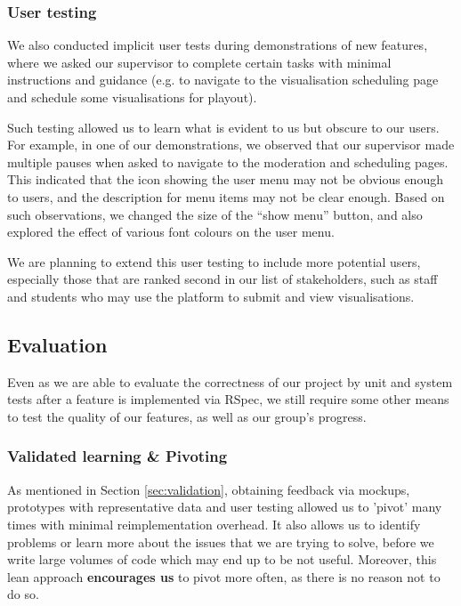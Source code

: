 ﻿\documentclass[a4paper, titlepage]{article}
\begin{document}
\subsubsection{User testing}

We also conducted implicit user tests during demonstrations of new features, where we asked our supervisor to complete certain tasks with minimal instructions and guidance (e.g. to navigate to the visualisation scheduling page and schedule some visualisations for playout).

Such testing allowed us to learn what is evident to us but obscure to our users. For example, in one of our demonstrations, we observed that our supervisor made multiple pauses when asked to navigate to the moderation and scheduling pages. This indicated that the icon showing the user menu may not be obvious enough to users, and the description for menu items may not be clear enough. Based on such observations, we changed the size of the ``show menu'' button, and also explored the effect of various font colours on the user menu.

We are planning to extend this user testing to include more potential users, especially those that are ranked second in our list of stakeholders, such as staff and students who may use the platform to submit and 
view visualisations.

\subsection{Evaluation}

Even as we are able to evaluate the correctness of our project by unit and system tests after a feature is implemented via RSpec, we still require some other means to test the quality of our features, as well as our group's progress.

\subsubsection{Validated learning \& Pivoting}

As mentioned in Section \ref{sec:validation}, obtaining feedback via mockups, prototypes with representative data and user testing allowed us to 'pivot' many times with minimal reimplementation overhead. It also allows us to identify problems or learn more about the issues that we are trying to solve, before we write large volumes of code which may end up to be not useful. Moreover, this lean approach \textbf{encourages us} to pivot more often, as there is no reason not to do so.
\end{document}
